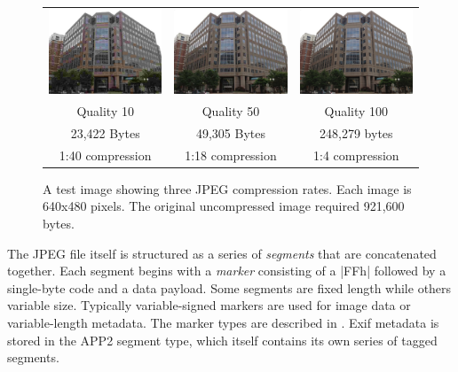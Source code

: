 \begin{figure}
\begin{tabular}{ccc}
\includegraphics[width=2in]{ch-jpeg/nsf_hq_640x480-q10.jpg} & 
\includegraphics[width=2in]{ch-jpeg/nsf_hq_640x480-q50.jpg} &
\includegraphics[width=2in]{ch-jpeg/nsf_hq_640x480-q100.jpg} \\
Quality 10 & Quality 50 & Quality 100 \\
23,422 Bytes & 49,305 Bytes & 248,279 bytes \\
1:40 compression & 1:18 compression & 1:4 compression\\
\end{tabular}
\caption{A test image showing three JPEG compression rates. Each image
  is 640x480 pixels. The original uncompressed image required 921,600 bytes.}
\end{figure}

The JPEG file itself is structured as a series of \emph{segments} that are
concatenated together. Each segment begins with a \emph{marker}
consisting of a |FFh| followed by a single-byte code and a data payload. Some segments are fixed
length while others variable size. Typically variable-signed markers
are used for image data or variable-length metadata. The marker
types are described in . Exif metadata is stored in the APP2
segment type, which itself contains its own series of tagged
segments. 

